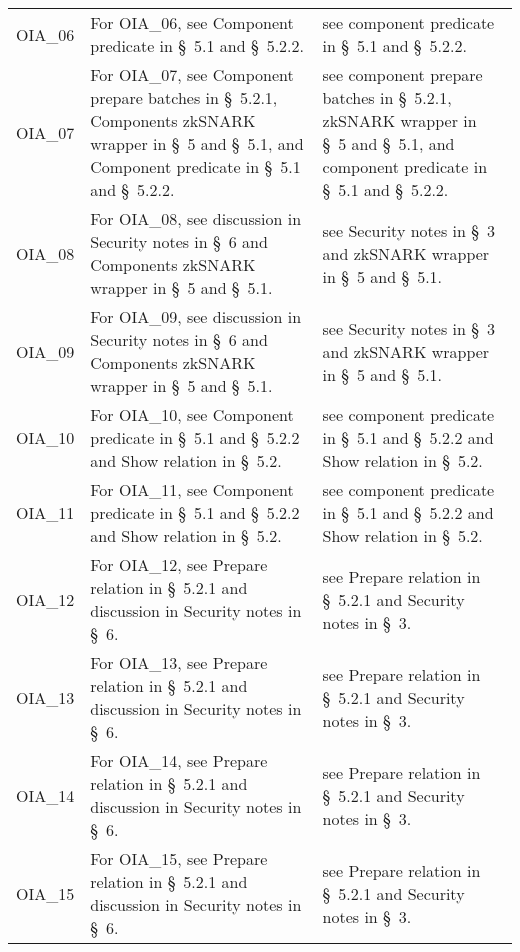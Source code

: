 \begin{landscape}
\begin{longtable}{p{3cm} p{10cm} p{7cm}}
OIA\_06 &
For OIA\_06, see Component predicate in \S~5.1 and \S~5.2.2. &
see component predicate in \S~5.1 and \S~5.2.2. \\

OIA\_07 &
For OIA\_07, see Component prepare batches in \S~5.2.1, Components zkSNARK wrapper in \S~5 and \S~5.1, and Component predicate in \S~5.1 and \S~5.2.2. &
see component prepare batches in \S~5.2.1, zkSNARK wrapper in \S~5 and \S~5.1, and component predicate in \S~5.1 and \S~5.2.2. \\

OIA\_08 &
For OIA\_08, see discussion in Security notes in \S~6 and Components zkSNARK wrapper in \S~5 and \S~5.1. &
see Security notes in \S~3 and zkSNARK wrapper in \S~5 and \S~5.1. \\

OIA\_09 &
For OIA\_09, see discussion in Security notes in \S~6 and Components zkSNARK wrapper in \S~5 and \S~5.1. &
see Security notes in \S~3 and zkSNARK wrapper in \S~5 and \S~5.1. \\

OIA\_10 &
For OIA\_10, see Component predicate in \S~5.1 and \S~5.2.2 and Show relation in \S~5.2. &
see component predicate in \S~5.1 and \S~5.2.2 and Show relation in \S~5.2. \\

OIA\_11 &
For OIA\_11, see Component predicate in \S~5.1 and \S~5.2.2 and Show relation in \S~5.2. &
see component predicate in \S~5.1 and \S~5.2.2 and Show relation in \S~5.2. \\

OIA\_12 &
For OIA\_12, see Prepare relation in \S~5.2.1 and discussion in Security notes in \S~6. &
see Prepare relation in \S~5.2.1 and Security notes in \S~3. \\

OIA\_13 &
For OIA\_13, see Prepare relation in \S~5.2.1 and discussion in Security notes in \S~6. &
see Prepare relation in \S~5.2.1 and Security notes in \S~3. \\

OIA\_14 &
For OIA\_14, see Prepare relation in \S~5.2.1 and discussion in Security notes in \S~6. &
see Prepare relation in \S~5.2.1 and Security notes in \S~3. \\

OIA\_15 &
For OIA\_15, see Prepare relation in \S~5.2.1 and discussion in Security notes in \S~6. &
see Prepare relation in \S~5.2.1 and Security notes in \S~3. \\


\end{longtable}
\end{landscape}
